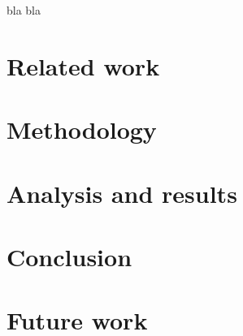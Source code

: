 \documentclass[12pt]{report}
\begin{document}
bla bla


\section{Related work}

\section{Methodology}

\section{Analysis and results}

\section{Conclusion}

\section{Future work}
\end{document}
